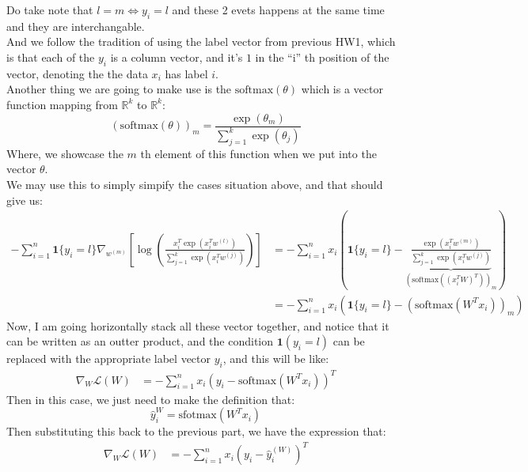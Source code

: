 \documentclass[]{article}
\begin{document}
        Do take note that $l = m \iff y_i = l$ and these 2 evets happens at the same time and they are interchangable.  
        \\
        And we follow the tradition of using the label vector from previous HW1, which is that each of the $y_i$ is a column vector, and it's $1$ in the ``i'' th position of the vector, denoting the the data $x_i$ has label $i$. 
        \\
        Another thing we are going to make use is the $\text{softmax}(\theta)$ which is a vector function mapping from $\mathbb{R}^k$ to $\mathbb{R}^k$: 
        $$
            \left(
                \text{softmax}(\theta)
            \right)_m
            = \frac{\exp(\theta_m)}{
                \sum_{j = 1}^{k}\exp(\theta_j)
            }
        $$
        Where, we showcase the $m$ th element of this function when we put into the vector $\theta$. 
        \\
        We may use this to simply simpify the cases situation above, and that should give us: 
        \begin{align*}\tag{B.4.4}\label{eqn:B.4.4}
            -\sum_{i = 1}^{n}
                \mathbf{1}\{y_i = l\}
                \nabla_{w^{(m)}} \left[
                    \log \left(
                    \frac{x_i^T\exp(x_i^T w^{(l)})}{
                        \sum_{j = 1}^{k}
                            \exp(x_i^T w^{(j)})
                    }
                    \right)
                \right] 
            &= 
            -\sum_{i = 1}^{n} 
            x_i \left(
                \mathbf{1}\{y_i = l\} - 
                \underbrace{\frac{
                        \exp(x_i^T w^{(m)})
                    }{
                            \sum_{j = 1}^{k}
                                \exp\left(
                                    x_i^T w^{(j)}
                                \right)
                   }}_{(\text{softmax}((x_i^TW)^T))_m}
                \right)
            \\
            &= 
            -\sum_{i = 1}^{n} 
            x_i \left(
                \mathbf{1}\{y_i = l\}
                - (\text{softmax}(W^Tx_i))_m
                \right)
        \end{align*}
        Now, I am going horizontally stack all these vector together, and notice that it can be written as an outter product, and the condition $\mathbf{1}(y_i = l)$ can be replaced with the appropriate label vector $y_i$, and this will be like: 
        \begin{align*}\tag{B.4.5}\label{eqn:B.4.5}
            \nabla_{W}\mathcal{L}(W) &=
            -\sum_{i = 1}^{n}
                x_i(y_i - \text{softmax}(W^Tx_i))^T
        \end{align*}
        Then in this case, we just need to make the definition that: 
        $$
            \hat{y}_i^{W} = \text{sfotmax}(W^Tx_i)
        $$
        Then substituting this back to the previous part, we have the expression that: 
        \begin{align*}\tag{B.4.6}\label{eqn:B.4.6}
            \nabla_{W}\mathcal{L}(W) &=
            -\sum_{i = 1}^{n}
                x_i(y_i - \hat{y}_i^{(W)})^T
        \end{align*}
\end{document}
